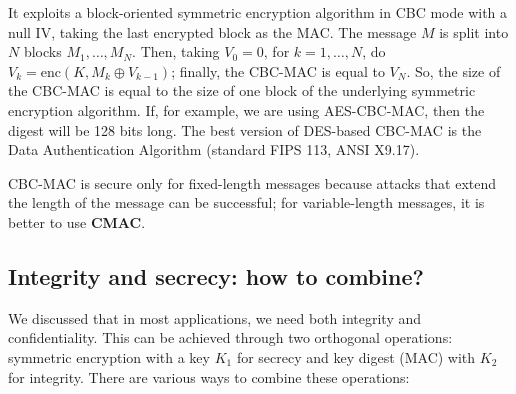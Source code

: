 It exploits a block-oriented symmetric encryption algorithm in CBC mode with a null IV, taking the last encrypted block as the MAC. The message \(M\) is split into \(N\) blocks \(M_1, \ldots, M_N\). Then, taking \(V_0 = 0\), for \(k = 1, \ldots, N\), do \(V_k = \text{enc}(K, M_k \oplus V_{k-1})\); finally, the CBC-MAC is equal to \(V_N\). So, the size of the CBC-MAC is equal to the size of one block of the underlying symmetric encryption algorithm. If, for example, we are using AES-CBC-MAC, then the digest will be 128 bits long. The best version of DES-based CBC-MAC is the Data Authentication Algorithm (standard FIPS 113, ANSI X9.17).

CBC-MAC is secure only for fixed-length messages because attacks that extend the length of the message can be successful; for variable-length messages, it is better to use \textbf{CMAC}.


\subsection{Integrity and secrecy: how to combine?}
We discussed that in most applications, we need both integrity and confidentiality. This can be achieved through two orthogonal operations: symmetric encryption with a key \(K_1\) for secrecy and key digest (MAC) with \(K_2\) for integrity. There are various ways to combine these operations:

